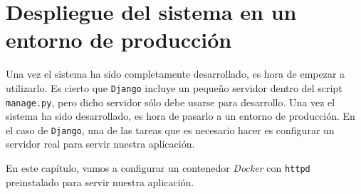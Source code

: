 \chapter{Despliegue del sistema en un entorno de producción}
Una vez el sistema ha sido completamente desarrollado, es hora de empezar a utilizarlo. Es cierto que \texttt{Django} incluye un pequeño servidor dentro del script \texttt{manage.py}, pero dicho servidor sólo debe usarse para desarrollo. Una vez el sistema ha sido desarrollado, es hora de pasarlo a un entorno de producción. En el caso de \texttt{Django}, una de las tareas que es necesario hacer es configurar un servidor real para servir nuestra aplicación. 

En este capítulo, vamos a configurar un contenedor \textit{Docker} con \texttt{httpd} preinstalado para servir nuestra aplicación.
